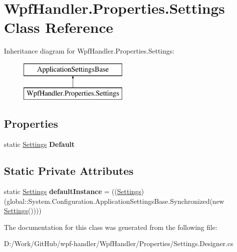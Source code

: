 \hypertarget{class_wpf_handler_1_1_properties_1_1_settings}{}\section{Wpf\+Handler.\+Properties.\+Settings Class Reference}
\label{class_wpf_handler_1_1_properties_1_1_settings}
Inheritance diagram for Wpf\+Handler.\+Properties.\+Settings\+:\begin{figure}[H]
\begin{center}
\leavevmode
\includegraphics[height=2.000000cm]{d7/d4f/class_wpf_handler_1_1_properties_1_1_settings}
\end{center}
\end{figure}
\subsection*{Properties}
\begin{DoxyCompactItemize}
\item 
\mbox{\label{class_wpf_handler_1_1_properties_1_1_settings_a252db64811cbf5a2fccc03433c9566c3}} 
static \mbox{\hyperlink{class_wpf_handler_1_1_properties_1_1_settings}{Settings}} {\bfseries Default}
\end{DoxyCompactItemize}
\subsection*{Static Private Attributes}
\begin{DoxyCompactItemize}
\item 
\mbox{\label{class_wpf_handler_1_1_properties_1_1_settings_a7b2e360d53ec59976635347e45223008}} 
static \mbox{\hyperlink{class_wpf_handler_1_1_properties_1_1_settings}{Settings}} {\bfseries default\+Instance} = ((\mbox{\hyperlink{class_wpf_handler_1_1_properties_1_1_settings}{Settings}})(global\+::\+System.\+Configuration.\+Application\+Settings\+Base.\+Synchronized(new \mbox{\hyperlink{class_wpf_handler_1_1_properties_1_1_settings}{Settings}}())))
\end{DoxyCompactItemize}


The documentation for this class was generated from the following file\+:\begin{DoxyCompactItemize}
\item 
D\+:/\+Work/\+Git\+Hub/wpf-\/handler/\+Wpf\+Handler/\+Properties/Settings.\+Designer.\+cs\end{DoxyCompactItemize}
